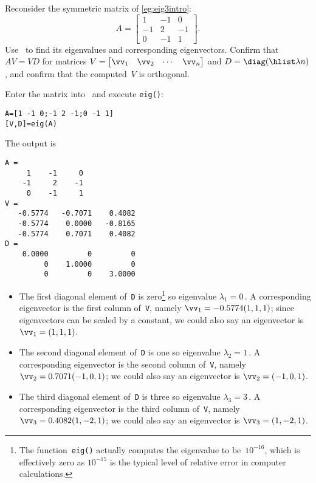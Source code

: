 \begin{example} \label{eg:eig3eig}
Reconsider the symmetric matrix of \autoref{eg:eig3intro}:
\begin{equation*}
A=\begin{bmatrix} 1&-1&0\\-1&2&-1\\0&-1&1 \end{bmatrix}.
\end{equation*}
Use \script\ to find its eigenvalues and corresponding eigenvectors.
Confirm that \(AV=VD\) for matrices \(V=\begin{bmatrix} \vv_1&\vv_2&\cdots&\vv_n \end{bmatrix}\) and \(D=\diag(\hlist\lambda n)\), and confirm that the computed~\(V\) is orthogonal.
\begin{solution} 
Enter the matrix into \script\ and execute \verb|eig()|:
\setbox\ajrqrbox\hbox{}%
\marginpar{\usebox{\ajrqrbox}}%
\begin{verbatim}
A=[1 -1 0;-1 2 -1;0 -1 1]
[V,D]=eig(A)
\end{verbatim}
The output is
\begin{verbatim}
A =
     1    -1     0
    -1     2    -1
     0    -1     1
V =
   -0.5774   -0.7071    0.4082
   -0.5774    0.0000   -0.8165
   -0.5774    0.7071    0.4082
D =
    0.0000         0         0
         0    1.0000         0
         0         0    3.0000
\end{verbatim}
\begin{itemize}
\item The first diagonal element of~\verb|D| is zero\footnote{The function~\texttt{eig()} actually computes the eigenvalue to be~\(10^{-16}\), which is effectively zero as \(10^{-15}\) is the typical level of relative error in computer calculations.} so eigenvalue \(\lambda_1=0\)\,.
A corresponding eigenvector is the first column of~\verb|V|, namely \(\vv_1=-0.5774(1,1,1)\);  since eigenvectors can be scaled by a constant, we could also say an eigenvector is \(\vv_1=(1,1,1)\).
\item The second diagonal element of~\verb|D| is one so eigenvalue \(\lambda_2=1\)\,.
A corresponding eigenvector is the second column of~\verb|V|, namely \(\vv_2=0.7071(-1,0,1)\);  we could also say an eigenvector is \(\vv_2=(-1,0,1)\).
\item The third diagonal element of~\verb|D| is three so eigenvalue \(\lambda_3=3\)\,.
A corresponding eigenvector is the third column of~\verb|V|, namely \(\vv_3=0.4082(1,-2,1)\);  we could also say an eigenvector is \(\vv_3=(1,-2,1)\).

\end{itemize}
\end{solution}
\end{example}
